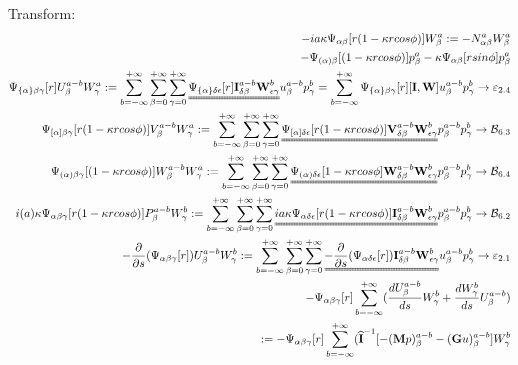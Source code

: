 \documentclass{Note}
\begin{document}
Transform:
\begin{equation}
\begin{aligned}
-ia\kappa \Psi_{\alpha\beta}[r(1-\kappa rcos\phi)]W_\beta^a:=-N_{\alpha\beta}^a W_\beta^a\\
-\Psi_{(\alpha)\beta}[(1-\kappa r cos\phi)]p_\beta^a-\kappa \Psi_{\alpha\beta}[r sin\phi]p_\beta^a\\
 \Psi_{\{\alpha\}\beta\gamma} [r]U_\beta^{a-b}W_\gamma^a:=\sum_{b=-\infty}^{+\infty} \sum_{\beta=0}^{+\infty}\sum_{\gamma=0}^{+\infty}\uuline{ \Psi_{\{\alpha\}\delta\epsilon}[r]\textbf{I}_{\delta\beta}^{a-b}\textbf{W}_{\epsilon\gamma}^{b}}u_\beta^{a-b}p_\gamma^{b}=\sum_{b=-\infty}^{+\infty}\Psi_{\{\alpha\}\beta\gamma}[r][\textbf{I},\textbf{W}]u_\beta^{a-b}p_\gamma^{b}\rightarrow\mathcal{\varepsilon}_{2.4}\\
 \Psi_{[\alpha]\beta\gamma} [r(1-\kappa rcos\phi)]V_\beta^{a-b}W_\gamma^a:=\sum_{b=-\infty}^{+\infty} \sum_{\beta=0}^{+\infty}\sum_{\gamma=0}^{+\infty}\uuline{ \Psi_{[\alpha]\delta\epsilon}[r(1-\kappa r cos\phi)]\textbf{V}_{\delta\beta}^{a-b}\textbf{W}_{\epsilon\gamma}^{b}}p_\beta^{a-b}p_\gamma^{b}\rightarrow\mathcal{B}_{6.3}\\
\Psi_{(\alpha)\beta\gamma} [(1-\kappa rcos\phi)]W_\beta^{a-b}W_\gamma^a:=\sum_{b=-\infty}^{+\infty} \sum_{\beta=0}^{+\infty}\sum_{\gamma=0}^{+\infty}\uuline{ \Psi_{(\alpha)\delta\epsilon}[1-\kappa r cos\phi]\textbf{W}_{\delta\beta}^{a-b}\textbf{W}_{\epsilon\gamma}^{b}}p_\beta^{a-b}p_\gamma^{b}\rightarrow\mathcal{B}_{6.4}\\
 i(a)\kappa \Psi_{\alpha\beta\gamma}[r(1-\kappa r cos\phi)]P_\beta^{a-b}W_\gamma^{b}:=\sum_{b=-\infty}^{+\infty} \sum_{\beta=0}^{+\infty}\sum_{\gamma=0}^{+\infty}\uuline{ ia\kappa \Psi_{\alpha\delta\epsilon}[r(1-\kappa r cos\phi)]\textbf{I}_{\delta\beta}^{a-b}\textbf{W}_{\epsilon\gamma}^{b}}p_\beta^{a-b}p_\gamma^{b}\rightarrow\mathcal{B}_{6.2}\\
 -{{\partial }\over {\partial s}}(\Psi_{\alpha\beta\gamma}[r])U_\beta^{a-b}W_\gamma^{b}:=\sum_{b=-\infty}^{+\infty} \sum_{\beta=0}^{+\infty}\sum_{\gamma=0}^{+\infty}\uuline{-{\partial\over \partial s} (\Psi_{\alpha\delta\epsilon}[r])\textbf{I}_{\delta\beta}^{a-b}\textbf{W}_{\epsilon\gamma}^{b}}u_\beta^{a-b}p_\gamma^{b}\rightarrow\mathcal{\varepsilon}_{2.1}\\
-\Psi_{\alpha\beta\gamma}[r]\sum_{b=-\infty}^{+\infty}({{d U_\beta^{a-b} \over {d s}}W_\gamma^{b}}+{dW_\gamma^{b}\over ds}U_\beta^{a-b})\\
:=-\Psi_{\alpha\beta\gamma}[r]\sum_{b=-\infty}^{+\infty}(\widehat{\textbf{I}}^{-1}[-{(\textbf{M}p)_\beta^{a-b}-(\textbf{G}u)_\beta^{a-b}]W_\gamma^{b}}

\end{aligned}
\end{equation}
\end{document}
